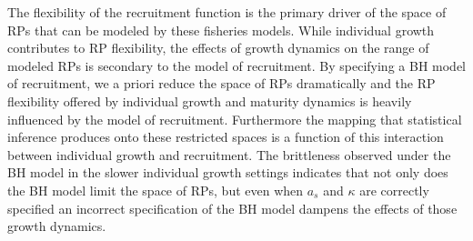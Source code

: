 
%
The flexibility of the recruitment function is the primary driver of the space 
of RPs that can be modeled by these fisheries models. While individual growth 
contributes to RP flexibility, the effects of growth dynamics on the range of 
modeled RPs is secondary to the model of recruitment. By specifying a BH model 
of recruitment, we a priori reduce the space of RPs dramatically and the RP 
flexibility offered by individual growth and maturity dynamics is heavily influenced
by the model of recruitment. Furthermore the mapping that statistical inference 
produces onto these restricted spaces is a function of this interaction between 
individual growth and recruitment. The brittleness observed under the BH model in the 
slower individual growth settings indicates that not only does the BH model limit 
the space of RPs, but even when $a_s$ and $\kappa$ are correctly specified an 
incorrect specification of the BH model dampens the effects of those growth dynamics. %
%


